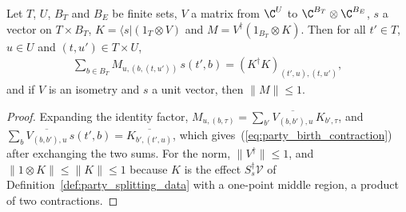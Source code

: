 \begin{theorem}
    \label{thm:party_birth_contraction}
    \leanok
    Let $T$, $U$, $B_T$ and $B_E$ be finite sets, $V$ a matrix from $\C^U$ to
    $\C^{B_T}\otimes\C^{B_E}$, $s$ a vector on $T\times B_T$, $K=\langle s|(1_T\otimes V)$ and
    $M=V^\dagger(1_{B_T}\otimes K)$. Then for all $t'\in T$, $u\in U$ and $(t,u')\in T\times U$,
    \begin{align}
        \sum_{b\in B_T}M_{u,(b,(t,u'))}\,s(t',b)=(K^\dagger K)_{(t',u),(t,u')},
        \label{eq:party_birth_contraction}
    \end{align}
    and if $V$ is an isometry and $s$ a unit vector, then $\lVert M\rVert\leq1$.
\end{theorem}
\begin{proof}\leanok
    Expanding the identity factor,
    $M_{u,(b,\tau)}=\sum_{b'}\overline{V_{(b,b'),u}}\,K_{b',\tau}$, and
    $\sum_b\overline{V_{(b,b'),u}}\,s(t',b)=\overline{K_{b',(t',u)}}$, which
    gives~(\ref{eq:party_birth_contraction}) after exchanging the two sums. For the norm,
    $\lVert V^\dagger\rVert\leq1$, and $\lVert1\otimes K\rVert\leq\lVert K\rVert\leq1$ because $K$
    is the effect $S_s^\dagger\mathcal V$ of Definition~\ref{def:party_splitting_data} with a
    one-point middle region, a product of two contractions.
\end{proof}

